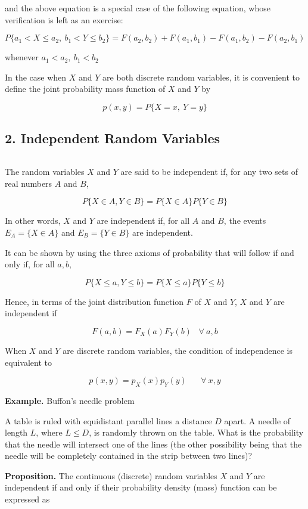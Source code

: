 and the above equation is a special case of the following equation, whose verification is left as an exercise:

$$P\{a_1 < X \leq a_2,~b_1 < Y \leq b_2\} = F(a_2,b_2) + F(a_1,b_1) - F(a_1,b_2) - F(a_2,b_1)$$

whenever $a_1 < a_2,~b_1 < b_2$

In the case when $X$ and $Y$ are both discrete random variables, it is convenient to define the joint probability mass function of $X$ and $Y$ by

$$p(x,y) = P\{X = x,~Y = y\}$$

\subsection*{2. Independent Random Variables}$ $

The random variables $X$ and $Y$ are said to be independent if, for any two sets of real numbers $A$ and $B$,

$$P\{X \in A,Y \in B\} = P\{X \in A\}P\{Y \in B\}$$

In other words, $X$ and $Y$ are independent if, for all $A$ and $B$, the events $E_A = \{X \in A\}$ and $E_B = \{Y \in B\}$ are independent.

It can be shown by using the three axioms of probability that will follow if and only if, for all $a,b,$

$$P\{X \leq a,Y \leq b\} = P\{X \leq a\}P\{Y \leq b\}$$

Hence, in terms of the joint distribution function $F$ of $X$ and $Y$, $X$ and $Y$ are independent if

$$F(a,b) = F_X (a)F_Y(b) \hspace{10pt} \forall~a,b$$

When $X$ and $Y$ are discrete random variables, the condition of independence is equivalent to

$$p(x,y) = p_X(x)p_Y(y)\hspace{20pt} \forall~ x,y$$

\newpage

\textbf{Example.} Buffon's needle problem

A table is ruled with equidistant parallel lines a distance $D$ apart. A needle of length $L$, where $L \leq D$, is randomly thrown on the table. What is the probability that the needle will intersect one of the lines (the other possibility being that the needle will be completely contained in the strip between two lines)?

\textbf{Proposition.} The continuous (discrete) random variables $X$ and $Y$ are independent if and only if their probability density (mass) function can be expressed as

